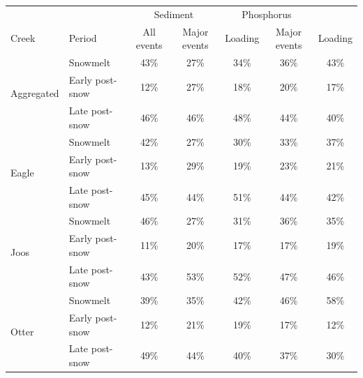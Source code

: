 \documentclass[12pt]{article}
\begin{document}
\begin{table}[h]
    \begin{center}
    \begin{tabular}{llccccc}
        &  & \multicolumn{2}{c}{Sediment} & \multicolumn{2}{c}{Phosphorus} \\
        Creek & Period & All events & Major events & Loading & Major events & Loading \\
        \hline 
        \multirow{3}{*}{Aggregated} & Snowmelt & 
        43\% &
        27\% & 
        34\% & 
        36\% & 
        43\% \\
        & Early post-snow & 
        12\% &
        27\% & 
        18\% & 
        20\% & 
        17\% \\
        & Late post-snow & 
        46\% &
        46\% & 
        48\% & 
        44\% & 
        40\% \\
        
        \hline 
        \multirow{3}{*}{Eagle} & Snowmelt & 
        42\% &
        27\% & 
        30\% & 
        33\% & 
        37\% \\
        & Early post-snow & 
        13\% &
        29\% & 
        19\% & 
        23\% & 
        21\% \\
        & Late post-snow & 
        45\% &
        44\% & 
        51\% & 
        44\% & 
        42\% \\
        
        \hline 
        \multirow{3}{*}{Joos} & Snowmelt & 
        46\% &
        27\% & 
        31\% & 
        36\% & 
        35\% \\
        & Early post-snow & 
        11\% &
        20\% & 
        17\% & 
        17\% & 
        19\% \\
        & Late post-snow & 
        43\% &
        53\% & 
        52\% & 
        47\% & 
        46\% \\
        
        \hline 
        \multirow{3}{*}{Otter} & Snowmelt & 
        39\% &
        35\% & 
        42\% & 
        46\% & 
        58\% \\
        & Early post-snow & 
        12\% &
        21\% & 
        19\% & 
        17\% & 
        12\% \\
        & Late post-snow & 
        49\% &
        44\% & 
        40\% & 
        37\% & 
        30\% \\
    \end{tabular}
    \end{center}
\end{table}
\end{document}
